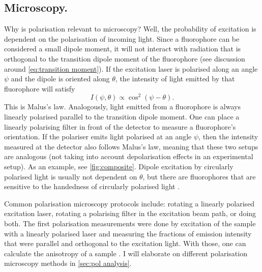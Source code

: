 \subsection{Microscopy.} Why is polarisation relevant to microscopy? Well, the probability of excitation is dependent on the polarisation of incoming light. Since a fluorophore can be considered a small dipole moment, it will not interact with radiation that is orthogonal to the transition dipole moment of the fluorophore (see discussion around \autoref{eq:transition moment}). If the excitation laser is polarised along an angle $ \psi $ and the dipole is oriented along $ \theta $, the intensity of light emitted by that fluorophore will satisfy 
\begin{equation}
	\label{eq:malus}
	I(\psi, \theta) \propto \cos^2(\psi-\theta).
\end{equation}
This is Malus's law. Analogously, light emitted from a fluorophore is always linearly polarised parallel to the transition dipole moment. One can place a linearly polarising filter in front of the detector to measure a fluorophore's orientation. If the polariser emits light polarised at an angle $ \psi $, then the intensity measured at the detector also follows Malus's law, meaning that these two setups are analogous (not taking into account depolarisation effects in an experimental setup). As an example, see \autoref{fig:composite}. Dipole excitation by circularly polarised light is usually not dependent on $ \theta $, but there are fluorophores that are sensitive to the handedness of circularly polarised light \cite{Takaishi2019}.

Common polarisation microscopy protocols include: rotating a linearly polarised excitation laser, rotating a polarising filter in the excitation beam path, or doing both. The first polarisation measurements were done by excitation of the sample with a linearly polarised laser and measuring the fractions of emission intensity that were parallel and orthogonal to the excitation light. With those, one can calculate the anisotropy of a sample \cite{Camacho2019}. I will elaborate on different polarisation microscopy methods in \autoref{sec:pol analysis}. 


